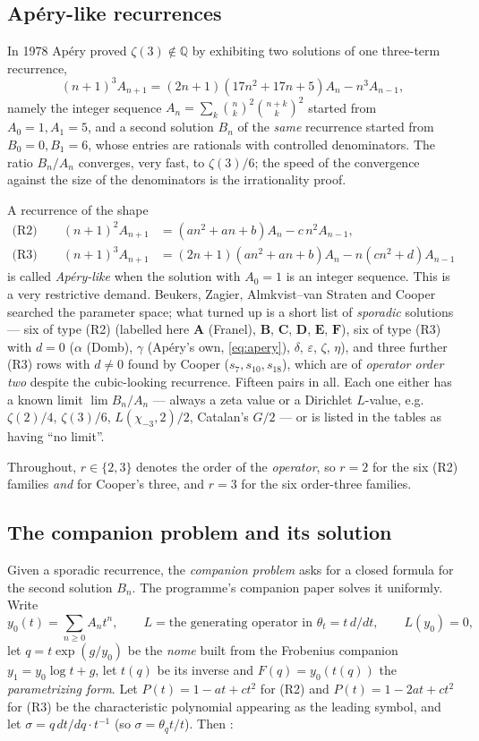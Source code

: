 \documentclass[11pt,reqno]{amsart}
\theoremstyle{plain}
\theoremstyle{definition}
\theoremstyle{remark}
\newcommand{\Q}{\mathbb{Q}}
\newcommand{\thq}{\theta_q}
\newcommand{\tht}{\theta_t}
\newcommand{\chim}[1]{\chi_{-#1}}
\begin{document}
\subsection{Ap\'ery-like recurrences}
In 1978 Ap\'ery proved $\zeta(3)\notin\Q$ by exhibiting two solutions of
one three-term recurrence,
\begin{equation}\label{eq:apery}
(n+1)^3A_{n+1}=(2n+1)(17n^2+17n+5)A_n-n^3A_{n-1},
\end{equation}
namely the integer sequence $A_n=\sum_k\binom nk^2\binom{n+k}k^2$ started
from $A_0=1,A_1=5$, and a second solution $B_n$ of the \emph{same}
recurrence started from $B_0=0,B_1=6$, whose entries are rationals with
controlled denominators. The ratio $B_n/A_n$ converges, very fast, to
$\zeta(3)/6$; the speed of the convergence against the size of the
denominators is the irrationality proof.

A recurrence of the shape
\begin{align}
\text{(R2)}\qquad (n+1)^2A_{n+1}&=(an^2+an+b)A_n-c\,n^2A_{n-1},
\label{eq:R2}\\
\text{(R3)}\qquad (n+1)^3A_{n+1}&=(2n+1)(an^2+an+b)A_n-n(cn^2+d)A_{n-1}
\label{eq:R3}
\end{align}
is called \emph{Ap\'ery-like} when the solution with $A_0=1$ is an integer
sequence. This is a very restrictive demand. Beukers, Zagier, Almkvist--van
Straten and Cooper searched the parameter space; what turned up is a short
list of \emph{sporadic} solutions --- six of type (R2) (labelled here
$\mathbf A$ (Franel), $\mathbf B$, $\mathbf C$, $\mathbf D$, $\mathbf E$,
$\mathbf F$), six of type (R3) with $d=0$ ($\alpha$ (Domb), $\gamma$
(Ap\'ery's own, \eqref{eq:apery}), $\delta$, $\varepsilon$, $\zeta$,
$\eta$), and three further (R3) rows with $d\neq0$ found by Cooper
($s_7,s_{10},s_{18}$), which are of \emph{operator order two} despite the
cubic-looking recurrence. Fifteen pairs in all. Each one either has a known
limit $\lim B_n/A_n$ --- always a zeta value or a Dirichlet $L$-value, e.g.
$\zeta(2)/4$, $\zeta(3)/6$, $L(\chim3,2)/2$, Catalan's $G/2$ --- or is
listed in the tables as having ``no limit''.

Throughout, $r\in\{2,3\}$ denotes the order of the \emph{operator}, so
$r=2$ for the six (R2) families \emph{and} for Cooper's three, and $r=3$
for the six order-three families.

\subsection{The companion problem and its solution}
Given a sporadic recurrence, the \emph{companion problem} asks for a closed
formula for the second solution $B_n$. The programme's companion paper
\cite{anchors} solves it uniformly. Write
\[
y_0(t)=\sum_{n\ge0}A_nt^n,\qquad
L=\text{the generating operator in }\tht=t\,d/dt,\qquad L(y_0)=0,
\]
let $q=t\exp(g/y_0)$ be the \emph{nome} built from the Frobenius companion
$y_1=y_0\log t+g$, let $t(q)$ be its inverse and $F(q)=y_0(t(q))$ the
\emph{parametrizing form}. Let $P(t)=1-at+ct^2$ for (R2) and
$P(t)=1-2at+ct^2$ for (R3) be the characteristic polynomial appearing as the
leading symbol, and let $\sigma=q\,dt/dq\cdot t^{-1}$ (so $\sigma=\thq t/t$).
Then \cite[Thm.~2.4, Thm.~3.3, Thm.~3.5]{anchors}:
\end{document}
